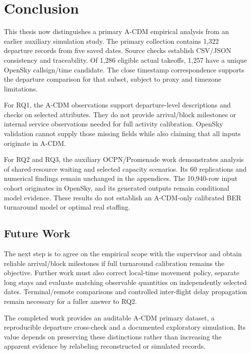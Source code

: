 \chapter{Conclusion}
\label{ch:conclusion}
This thesis now distinguishes a primary A-CDM empirical analysis from an earlier auxiliary simulation study. The primary collection contains 1,322 departure records from five saved dates. Source checks establish CSV/JSON consistency and traceability. Of 1,286 eligible actual takeoffs, 1,257 have a unique OpenSky callsign/time candidate. The close timestamp correspondence supports the departure comparison for that subset, subject to proxy and timezone limitations.

For RQ1, the A-CDM observations support departure-level descriptions and checks on selected attributes. They do not provide arrival/block milestones or internal service observations needed for full activity calibration. OpenSky validation cannot supply those missing fields while also claiming that all inputs originate in A-CDM.

For RQ2 and RQ3, the auxiliary OCPN/Promenade work demonstrates analysis of shared-resource waiting and selected capacity scenarios. Its 60 replications and numerical findings remain unchanged in the appendices. The 10,940-row input cohort originates in OpenSky, and its generated outputs remain conditional model evidence. These results do not establish an A-CDM-only calibrated BER turnaround model or optimal real staffing.

\section{Future Work}
The next step is to agree on the empirical scope with the supervisor and obtain reliable arrival/block milestones if full turnaround calibration remains the objective. Further work must also correct local-time movement policy, separate long stays and evaluate matching observable quantities on independently selected dates. Terminal/remote comparisons and controlled inter-flight delay propagation remain necessary for a fuller answer to RQ2.

The completed work provides an auditable A-CDM primary dataset, a reproducible departure cross-check and a documented exploratory simulation. Its value depends on preserving these distinctions rather than increasing the apparent evidence by relabeling reconstructed or simulated records.
